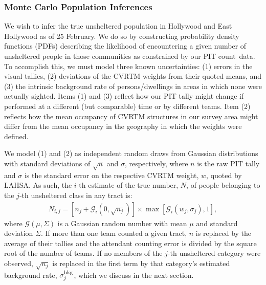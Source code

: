 \documentclass[11pt,twocolumn]{article}
\def\Count{count}
\def\resp{respectively}
\begin{document}

%
%

\subsubsection{Monte Carlo Population Inferences}
\label{sec:mc}

We wish to infer the true unsheltered population in Hollywood and East Hollywood as of 25 February. 
We do so by constructing probability density functions (PDFs) describing the likelihood of encountering 
a given number of unsheltered people in those communities as constrained by our PIT \Count\ data. 
To accomplish this, we must model three known uncertainties: (1) errors in the visual tallies, (2) deviations 
of the CVRTM weights from their quoted means, and (3) the intrinsic background rate of persons/dwellings
in areas in which none were actually sighted. Items (1) and (3) reflect how our PIT tally might change
if performed at a different (but comparable) time or by different teams. Item (2) reflects how the mean 
occupancy of CVRTM structures in our survey area might differ from the mean occupancy in the geography 
in which the weights were defined.

We model (1) and (2) as independent random draws from Gaussian distributions with standard 
deviations of $\sqrt{n}$ and $\sigma$, \resp, where $n$ is the raw PIT tally and $\sigma$ is the 
standard error on the respective CVRTM weight, $w$, quoted by LAHSA. As such, the $i$-th 
estimate of the true number, $N$, of people belonging to the $j$-th unsheltered class in any tract is:
\begin{multline}\label{eq:monte}
	N_{i,j} = \left[n_{j} + \mathcal{G}_{i}(0,\sqrt{n_{j}})\right]\times\max[\mathcal{G}_{i}(w_{j}, \sigma_{j}),1],
\end{multline}
where $\mathcal{G}(\mu,\Sigma)$ is a Gaussian random number with mean $\mu$ and standard deviation 
$\Sigma$. If more than one team counted a given tract, $n$ is replaced by the average of their tallies 
and the attendant counting error is divided by the square root of the number of teams. If no members
of the $j$-th unsheltered category were observed, $\sqrt{n_{j}}$ is replaced in the first term 
by that category's estimated background rate, $\sigma_{j}^{\rm bkg}$, which we discuss
in the next section.%
\end{document}
